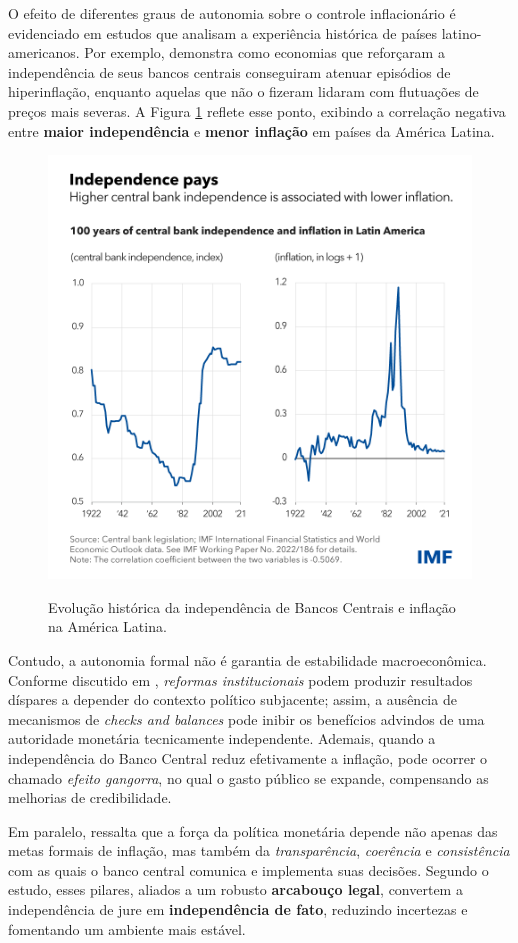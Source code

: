 \documentclass[a4paper,12pt]{article}[abnt2]
\begin{document}
O efeito de diferentes graus de autonomia sobre o controle inflacionário é evidenciado em estudos que analisam a experiência histórica de países latino-americanos. Por exemplo, \cite{jacome2022} demonstra como economias que reforçaram a independência de seus bancos centrais conseguiram atenuar episódios de hiperinflação, enquanto aquelas que não o fizeram lidaram com flutuações de preços mais severas. A Figura \ref{fig:independencepays} reflete esse ponto, exibindo a correlação negativa entre \textbf{maior independência} e \textbf{menor inflação} em países da América Latina.

\begin{figure}[H]
    \centering
    \caption{Evolução histórica da independência de Bancos Centrais e inflação na América Latina.}
    \includegraphics[width=0.7\linewidth]{Imagens/m4i1.png}
    \label{fig:independencepays}
\end{figure}

Contudo, a autonomia formal não é garantia de estabilidade macroeconômica. Conforme discutido em \cite{acemoglu2008}, \emph{reformas institucionais} podem produzir resultados díspares a depender do contexto político subjacente; assim, a ausência de mecanismos de \emph{checks and balances} pode inibir os benefícios advindos de uma autoridade monetária tecnicamente independente. Ademais, quando a independência do Banco Central reduz efetivamente a inflação, pode ocorrer o chamado \emph{efeito gangorra}, no qual o gasto público se expande, compensando as melhorias de credibilidade.

Em paralelo, \cite{unsal2023} ressalta que a força da política monetária depende não apenas das metas formais de inflação, mas também da \emph{transparência}, \emph{coerência} e \emph{consistência} com as quais o banco central comunica e implementa suas decisões. Segundo o estudo, esses pilares, aliados a um robusto \textbf{arcabouço legal}, convertem a independência de jure em \textbf{independência de fato}, reduzindo incertezas e fomentando um ambiente mais estável.
\end{document}
